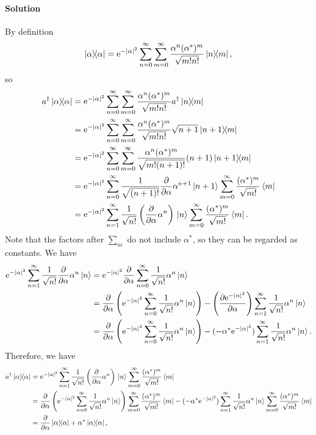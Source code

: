 \documentclass[hyperref, a4paper]{article}
\newcommand*{\ee}{\mathrm{e}}
\begin{document}
\paragraph{Solution} By definition
\[
    \dyad{\alpha} = \ee^{- \abs*{\alpha}^2} \sum_{n=0}^\infty \sum_{m=0}^\infty \frac{\alpha^n (\alpha^*)^m}{\sqrt{m! n!}} \dyad{n}{m},
\]
so 
\[
    \begin{aligned}
        a^\dagger \dyad{\alpha} &= \ee^{- \abs*{\alpha}^2} \sum_{n=0}^\infty \sum_{m=0}^\infty \frac{\alpha^n (\alpha^*)^m}{\sqrt{m! n!}} a^\dagger \dyad{n}{m} \\
        &= \ee^{- \abs*{\alpha}^2} \sum_{n=0}^\infty \sum_{m=0}^\infty \frac{\alpha^n (\alpha^*)^m}{\sqrt{m! n!}} \sqrt{n+1} \dyad{n+1}{m} \\
        &= \ee^{- \abs*{\alpha}^2} \sum_{n=0}^\infty \sum_{m=0}^\infty \frac{\alpha^n (\alpha^*)^m}{\sqrt{m! (n+1)!}} (n+1) \dyad{n+1}{m} \\
        &= \ee^{- \abs*{\alpha}^2 } \sum_{n=0}^\infty \frac{1}{\sqrt{(n+1)!}} \pdv{\alpha} \alpha^{n+1} \ket*{n+1} \sum_{m=0}^\infty \frac{ (\alpha^*)^m}{\sqrt{m!}} \bra{m} \\
        &= \ee^{- \abs*{\alpha}^2 } \sum_{n=1}^\infty \frac{1}{\sqrt{n!}} \left( \pdv{\alpha} \alpha^{n} \right) \ket*{n} \sum_{m=0}^\infty \frac{ (\alpha^*)^m}{\sqrt{m!}} \bra{m} .
    \end{aligned}
\]
Note that the factors after $\sum_m$ do not include $\alpha^*$, so they can be regarded as constants.
We have
\[
    \begin{aligned}
        \ee^{- \abs*{\alpha}^2 } \sum_{n=1}^\infty \frac{1}{\sqrt{n!}} \pdv{\alpha} \alpha^{n} \ket*{n} &= \ee^{- \abs*{\alpha}^2 } \pdv{\alpha} \sum_{n=0}^\infty \frac{1}{\sqrt{n!}} \alpha^{n} \ket*{n} \\
        &= \pdv{\alpha} \left( \ee^{- \abs*{\alpha}^2 } \sum_{n=0}^\infty \frac{1}{\sqrt{n!}} \alpha^{n} \ket*{n} \right) - \left(\pdv{\ee^{-\abs*{\alpha}^2 }}{\alpha}\right) \sum_{n=1}^\infty \frac{1}{\sqrt{n!}} \alpha^{n} \ket*{n} \\
        &= \pdv{\alpha} \left( \ee^{- \abs*{\alpha}^2 } \sum_{n=0}^\infty \frac{1}{\sqrt{n!}} \alpha^{n} \ket*{n} \right) - (- \alpha^* \ee^{- \abs*{\alpha}^2 }) \sum_{n=1}^\infty \frac{1}{\sqrt{n!}} \alpha^{n} \ket*{n} .
    \end{aligned}
\]
Therefore, we have
\[
    \begin{aligned}
        a^\dagger \dyad{\alpha} &= \ee^{- \abs*{\alpha}^2 } \sum_{n=1}^\infty \frac{1}{\sqrt{n!}} \left( \pdv{\alpha} \alpha^{n} \right) \ket*{n} \sum_{m=0}^\infty \frac{ (\alpha^*)^m}{\sqrt{m!}} \bra{m} \\
        &= \pdv{\alpha} \left( \ee^{- \abs*{\alpha}^2 } \sum_{n=0}^\infty \frac{1}{\sqrt{n!}} \alpha^{n} \ket*{n} \right) \sum_{m=0}^\infty \frac{ (\alpha^*)^m}{\sqrt{m!}} \bra{m} - (- \alpha^* \ee^{- \abs*{\alpha}^2 }) \sum_{n=1}^\infty \frac{1}{\sqrt{n!}}  \alpha^{n} \ket*{n} \sum_{m=0}^\infty \frac{ (\alpha^*)^m}{\sqrt{m!}} \bra{m} \\
        &= \pdv{\alpha} \dyad{\alpha} + \alpha^* \dyad{\alpha},
    \end{aligned}
\]
\end{document}
